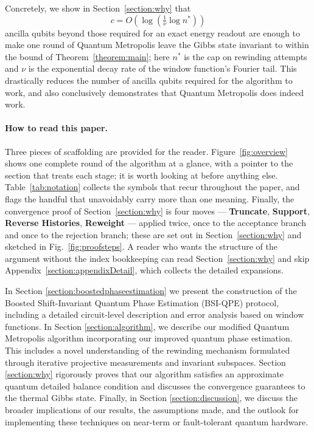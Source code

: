 \documentclass[aps,floatfix,10pt,amssymb,amsfont,amsmath,superscriptaddress,float,nofootinbib,longbibliography,nobalancelastpage,twocolumn]{revtex4-2}
\begin{document}
Concretely, we show in Section~\ref{section:why} that
\begin{equation}
    c = O\!\left(\log\!\left(\tfrac{1}{\nu}\log n^*\right)\right)
    \label{eq:headline}
\end{equation}
ancilla qubits beyond those required for an exact energy readout are enough to make one round of Quantum Metropolis leave the Gibbs state invariant to within the bound of Theorem~\ref{theorem:main}; here $n^*$ is the cap on rewinding attempts and $\nu$ is the exponential decay rate of the window function's Fourier tail. This drastically reduces the number of ancilla qubits required for the algorithm to work, and also conclusively demonstrates that Quantum Metropolis does indeed work.

\paragraph*{How to read this paper.} Three pieces of scaffolding are provided for the reader. Figure~\ref{fig:overview} shows one complete round of the algorithm at a glance, with a pointer to the section that treats each stage; it is worth looking at before anything else. Table~\ref{tab:notation} collects the symbols that recur throughout the paper, and flags the handful that unavoidably carry more than one meaning. Finally, the convergence proof of Section~\ref{section:why} is four moves --- \textbf{Truncate}, \textbf{Support}, \textbf{Reverse Histories}, \textbf{Reweight} --- applied twice, once to the acceptance branch and once to the rejection branch; these are set out in Section~\ref{section:why} and sketched in Fig.~\ref{fig:proofsteps}. A reader who wants the structure of the argument without the index bookkeeping can read Section~\ref{section:why} and skip Appendix~\ref{section:appendixDetail}, which collects the detailed expansions.

In Section \ref{section:boostedphaseestimation} we present the construction of the Boosted Shift-Invariant Quantum Phase Estimation (BSI-QPE) protocol, including a detailed circuit-level description and error analysis based on window functions. In Section \ref{section:algorithm}, we describe our modified Quantum Metropolis algorithm incorporating our improved quantum phase estimation. This includes a novel understanding of the rewinding mechanism formulated through iterative projective measurements and invariant subspaces. Section \ref{section:why} rigorously proves that our algorithm satisfies an approximate quantum detailed balance condition and discusses the convergence guarantees to the thermal Gibbs state. Finally, in Section \ref{section:discussion}, we discuss the broader implications of our results, the assumptions made, and the outlook for implementing these techniques on near-term or fault-tolerant quantum hardware.
\end{document}
